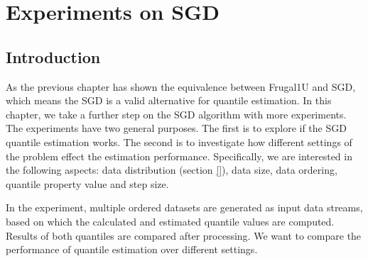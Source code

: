 
% 
\graphicspath{{Figures/Experiment_results/SGD/}{./}} 
\captionsetup[figure]{font=scriptsize,labelfont=bf}


\chapter{Experiments on SGD}
\label{ch: experiments}

\section{Introduction}
\label{sec: exp_intro}
As the previous chapter has shown the equivalence between Frugal1U and SGD, which means the SGD is a valid alternative for quantile estimation.
In this chapter, we take a further step on the SGD algorithm with more experiments.
The experiments have two general purposes. The first is to explore if the SGD quantile estimation works.
The second is to investigate how different settings of the problem effect the estimation performance. Specifically, we are interested in the following aspects: data distribution (section \ref{}), data size, data ordering, quantile property value and step size.

In the experiment, multiple ordered datasets are generated as input data streams, based on which the calculated and estimated quantile values are computed. Results of both quantiles are compared after processing. We want to compare the performance of quantile estimation over different settings.



